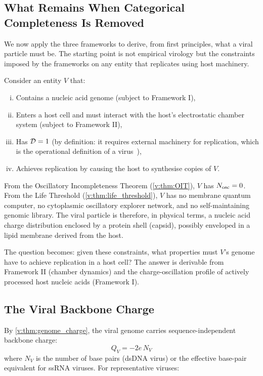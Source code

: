 \subsection{What Remains When Categorical Completeness Is Removed}

We now apply the three frameworks to derive, from first principles, what a viral particle must be. The starting point is not empirical virology but the constraints imposed by the frameworks on any entity that replicates using host machinery.

Consider an entity $V$ that:
\begin{enumerate}[(i)]
  \item Contains a nucleic acid genome (subject to Framework I),
  \item Enters a host cell and must interact with the host's electrostatic chamber system (subject to Framework II),
  \item Has $\mathcal{D} = 1$ (by definition: it requires external machinery for replication, which is the operational definition of a virus~\cite{Lwoff1957,Baltimore1971}),
  \item Achieves replication by causing the host to synthesise copies of $V$.
\end{enumerate}

From the Oscillatory Incompleteness Theorem (\cref{v:thm:OIT}), $V$ has $N_{\mathrm{osc}} = 0$. From the Life Threshold (\cref{v:thm:life_threshold}), $V$ has no membrane quantum computer, no cytoplasmic oscillatory explorer network, and no self-maintaining genomic library. The viral particle is therefore, in physical terms, a nucleic acid charge distribution enclosed by a protein shell (capsid), possibly enveloped in a lipid membrane derived from the host.

The question becomes: given these constraints, what properties must $V$'s genome have to achieve replication in a host cell? The answer is derivable from Framework II (chamber dynamics) and the charge-oscillation profile of actively processed host nucleic acids (Framework I).

\subsection{The Viral Backbone Charge}

By \cref{v:thm:genome_charge}, the viral genome carries sequence-independent backbone charge:
\begin{equation}
  Q_V = -2e \, N_V
  \label{v:eq:viral_charge}
\end{equation}
where $N_V$ is the number of base pairs (dsDNA virus) or the effective base-pair equivalent for ssRNA viruses. For representative viruses:

